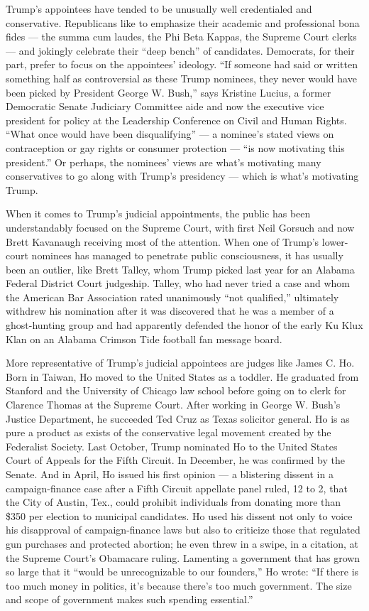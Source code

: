 Trump's appointees have tended to be unusually well credentialed and
conservative. Republicans like to emphasize their academic and
professional bona fides --- the summa cum laudes, the Phi Beta Kappas,
the Supreme Court clerks --- and jokingly celebrate their ``deep bench''
of candidates. Democrats, for their part, prefer to focus on the
appointees' ideology. ``If someone had said or written something half as
controversial as these Trump nominees, they never would have been picked
by President George W. Bush,'' says Kristine Lucius, a former Democratic
Senate Judiciary Committee aide and now the executive vice president for
policy at the Leadership Conference on Civil and Human Rights. ``What
once would have been disqualifying'' --- a nominee's stated views on
contraception or gay rights or consumer protection --- ``is now
motivating this president.'' Or perhaps, the nominees' views are what's
motivating many conservatives to go along with Trump's presidency ---
which is what's motivating Trump.

When it comes to Trump's judicial appointments, the public has been
understandably focused on the Supreme Court, with first Neil Gorsuch and
now Brett Kavanaugh receiving most of the attention. When one of Trump's
lower-court nominees has managed to penetrate public consciousness, it
has usually been an outlier, like Brett Talley, whom Trump picked last
year for an Alabama Federal District Court judgeship. Talley, who had
never tried a case and whom the American Bar Association rated
unanimously ``not qualified,'' ultimately withdrew his nomination after
it was discovered that he was a member of a ghost-hunting group and had
apparently defended the honor of the early Ku Klux Klan on an Alabama
Crimson Tide football fan message board.

More representative of Trump's judicial appointees are judges like James
C. Ho. Born in Taiwan, Ho moved to the United States as a toddler. He
graduated from Stanford and the University of Chicago law school before
going on to clerk for Clarence Thomas at the Supreme Court. After
working in George W. Bush's Justice Department, he succeeded Ted Cruz as
Texas solicitor general. Ho is as pure a product as exists of the
conservative legal movement created by the Federalist Society. Last
October, Trump nominated Ho to the United States Court of Appeals for
the Fifth Circuit. In December, he was confirmed by the Senate. And in
April, Ho issued his first opinion --- a blistering dissent in a
campaign-finance case after a Fifth Circuit appellate panel ruled, 12 to
2, that the City of Austin, Tex., could prohibit individuals from
donating more than \$350 per election to municipal candidates. Ho used
his dissent not only to voice his disapproval of campaign-finance laws
but also to criticize those that regulated gun purchases and protected
abortion; he even threw in a swipe, in a citation, at the Supreme
Court's Obamacare ruling. Lamenting a government that has grown so large
that it ``would be unrecognizable to our founders,'' Ho wrote: ``If
there is too much money in politics, it's because there's too much
government. The size and scope of government makes such spending
essential.''

